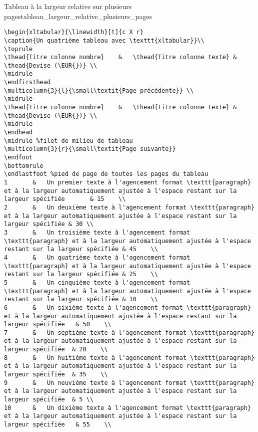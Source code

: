 \documentclass[a4paper, 11pt, twoside, fleqn]{memoir}
\begin{document}
\begin{exemple}{Tableau à la largeur relative sur plusieurs pages}{tableau_largeur_relative_plusieurs_pages}
\begin{verbatim}
\begin{xltabular}{\linewidth}[t]{c X r}
\caption{Un quatrième tableau avec \texttt{xltabular}}\\
\toprule
\thead{Titre colonne nombre} 	&	\thead{Titre colonne texte}	&	\thead{Devise (\EUR{})}	\\
\midrule
\endfirsthead
\multicolumn{3}{l}{\small\textit{Page précédente}} \\
\midrule
\thead{Titre colonne nombre} 	&	\thead{Titre colonne texte}	&	\thead{Devise (\EUR{})}	\\
\midrule
\endhead
\midrule %filet de milieu de tableau
\multicolumn{3}{r}{\small\textit{Page suivante}}
\endfoot
\bottomrule
\endlastfoot %pied de page de toutes les pages du tableau
1		&	Un premier texte à l'agencement format \texttt{paragraph} et à la largeur automatiquement ajustée à l'espace restant sur la largeur spécifiée 		& 15	\\
2		&	Un deuxième texte à l'agencement format \texttt{paragraph} et à la largeur automatiquement ajustée à l'espace restant sur la largeur spécifiée & 30	\\
3		&	Un troisième texte à l'agencement format \texttt{paragraph} et à la largeur automatiquement ajustée à l'espace restant sur la largeur spécifiée	& 45	\\
4		&	Un quatrième texte à l'agencement format \texttt{paragraph} et à la largeur automatiquement ajustée à l'espace restant sur la largeur spécifiée	& 25	\\
5		&	Un cinquième texte à l'agencement format \texttt{paragraph} et à la largeur automatiquement ajustée à l'espace restant sur la largeur spécifiée	& 10	\\
6		&	Un sixième texte à l'agencement format \texttt{paragraph} et à la largeur automatiquement ajustée à l'espace restant sur la largeur spécifiée	& 50	\\
7		&	Un septième texte à l'agencement format \texttt{paragraph} et à la largeur automatiquement ajustée à l'espace restant sur la largeur spécifiée	& 20	\\
8		&	Un huitième texte à l'agencement format \texttt{paragraph} et à la largeur automatiquement ajustée à l'espace restant sur la largeur spécifiée	& 35	\\
9		&	Un neuvième texte à l'agencement format \texttt{paragraph} et à la largeur automatiquement ajustée à l'espace restant sur la largeur spécifiée	& 5	\\
10		&	Un dixième texte à l'agencement format \texttt{paragraph} et à la largeur automatiquement ajustée à l'espace restant sur la largeur spécifiée	& 55	\\

\end{verbatim}
\end{exemple}
\end{document}
